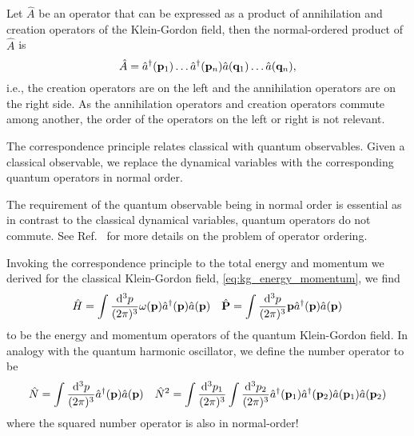 \begin{definition}
	Let $\hat{A}$ be an operator that can be expressed as a product of annihilation and creation operators of the Klein-Gordon field, then the normal-ordered product of $\hat{A}$ is
	\begin{equation}
		\hat{A}
		=
		\hat{a}^\dagger(\vb{p}_1)
		\dots
		\hat{a}^\dagger(\vb{p}_n)
		\hat{a}(\vb{q}_1)
		\dots
		\hat{a}(\vb{q}_n)
		,
	\end{equation}
	i.e., the creation operators are on the left and the annihilation operators are on the right side.
	As the annihilation operators and creation operators commute among another, the order of the operators on the left or right is not relevant.
\end{definition}

\begin{definition}
	The correspondence principle relates classical with quantum observables.
	Given a classical observable, we replace the dynamical variables with the corresponding quantum operators in normal order.
\end{definition}
\begin{remark}
	The requirement of the quantum observable being in normal order is essential as in contrast to the classical dynamical variables, quantum operators do not commute.
	See Ref.~\cite[p.~20]{Mukhanov2007} for more details on the problem of operator ordering.
\end{remark}

\begin{lemma}
	Invoking the correspondence principle to the total energy and momentum we derived for the classical Klein-Gordon field, \cref{eq:kg_energy_momentum}, we find
	\begin{align}
		\hat{H}
		=
		\int\frac{\dd[3]{p}}{(2\pi)^3}
		\omega(\vb{p})\hat{a}^\dagger(\vb{p})\hat{a}(\vb{p})
		&&
		\hat{\vb{P}}
		=
		\int\frac{\dd[3]{p}}{(2\pi)^3}
		\vb{p}\hat{a}^\dagger(\vb{p})\hat{a}(\vb{p})
		\label{eq:qkg_energy_momentum}
	\end{align}
	to be the energy and momentum operators of the quantum Klein-Gordon field.
	In analogy with the quantum harmonic oscillator, we define the number operator to be
	\begin{align}
		\hat{N}
		=
		\int\frac{\dd[3]{p}}{(2\pi)^3}
		\hat{a}^\dagger(\vb{p})
		\hat{a}(\vb{p})
		&&
		\hat{N}^2
		=
		\int\frac{\dd[3]{p_1}}{(2\pi)^3}
		\int\frac{\dd[3]{p_2}}{(2\pi)^3}
		\hat{a}^\dagger(\vb{p}_1)
		\hat{a}^\dagger(\vb{p}_2)
		\hat{a}(\vb{p}_1)
		\hat{a}(\vb{p}_2)
		\label{eq:qkg_number}
	\end{align}
	where the squared number operator is also in normal-order!
\end{lemma}


